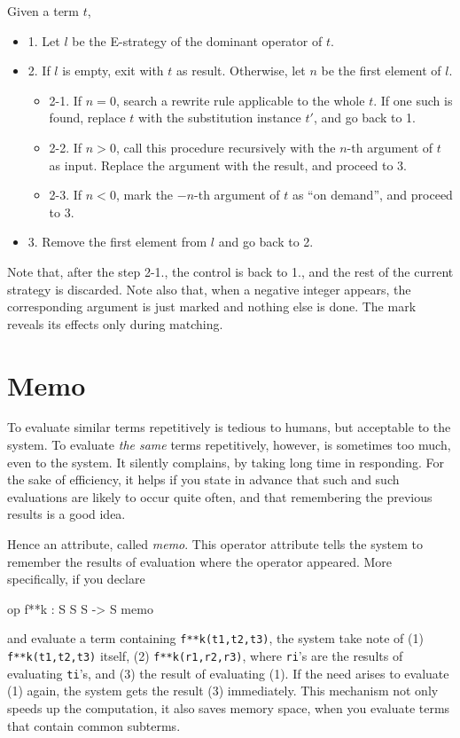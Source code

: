 \documentclass[a4paper]{memoir}
\begin{document}
Given a term $t$,
\begin{itemize}
\item[]1. Let $l$ be the E-strategy of the dominant operator of $t$.
\item[]2. If $l$ is empty, exit with $t$ as result. Otherwise, let
  $n$ be the first element of $l$.
  \begin{itemize}
  \item[]2-1. If $n = 0$, search a rewrite rule applicable to the whole
    $t$. If one such is found, replace $t$ with the substitution
    instance $t'$, and go back to 1.
  \item[]2-2. If $n > 0$, call this procedure recursively with the $n$-th
    argument of $t$ as input. Replace the argument with the result, and
    proceed to 3.
  \item[]2-3. If $n < 0$, mark the $-n$-th argument of $t$ as ``on demand'',
    and proceed to 3.
  \end{itemize}
\item[]3. Remove the first element from $l$ and go back to 2.
\end{itemize}
Note that, after the step 2-1., the control is back to 1., and the rest
of the current strategy is discarded.
Note also that, when a negative integer appears,
the corresponding argument is just marked and nothing else is done.
The mark reveals its effects only during matching.

\section{Memo}\label{sec:p2-memo-attribute}

To evaluate similar terms repetitively is tedious to humans,
but acceptable to the system. To evaluate {\em the same} terms repetitively,
however, is sometimes too much, even to the system. It silently
complains, by taking long time in responding. For the sake of
efficiency, it helps if you state in advance that such and such
evaluations are likely to occur quite often, and that remembering the
previous results is a good idea.

Hence an attribute, called {\em memo}.
This operator attribute tells the
system to remember the results of evaluation where the operator appeared.
More specifically, if you declare
\begin{vvtm}
\begin{ccode}
  op f**k : S S S -> S { memo }
\end{ccode}
\end{vvtm}
and evaluate a term containing \verb|f**k(t1,t2,t3)|, the system
take note of (1) \verb|f**k(t1,t2,t3)| itself, (2) \verb|f**k(r1,r2,r3)|,
where \verb|ri|'s are the results of evaluating \verb|ti|'s, and
(3) the result of evaluating (1). If the need arises to evaluate (1)
again, the system gets the result (3) immediately. This mechanism
not only speeds up the computation, it also saves memory space, when you
evaluate terms that contain common subterms.
\end{document}
